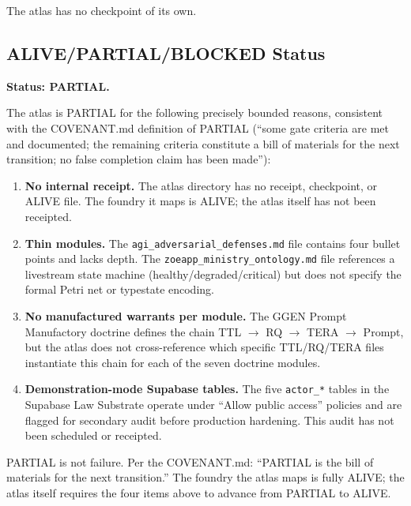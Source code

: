 The atlas has no checkpoint of its own.

\subsection{ALIVE/PARTIAL/BLOCKED Status}
\label{sec:atlas-evidence-status}

\textbf{Status: PARTIAL.}

The atlas is PARTIAL for the following precisely bounded reasons, consistent
with the COVENANT.md definition of PARTIAL (``some gate criteria are met and
documented; the remaining criteria constitute a bill of materials for the next
transition; no false completion claim has been made''):

\begin{enumerate}
  \item \textbf{No internal receipt.} The atlas directory has no receipt,
        checkpoint, or ALIVE file. The foundry it maps is ALIVE; the atlas
        itself has not been receipted.

  \item \textbf{Thin modules.} The \texttt{agi\_adversarial\_defenses.md} file
        contains four bullet points and lacks depth. The
        \texttt{zoeapp\_ministry\_ontology.md} file references a livestream state
        machine (healthy/degraded/critical) but does not specify the formal
        Petri net or typestate encoding.

  \item \textbf{No manufactured warrants per module.} The GGEN Prompt
        Manufactory doctrine defines the chain TTL $\to$ RQ $\to$ TERA $\to$
        Prompt, but the atlas does not cross-reference which specific TTL/RQ/TERA
        files instantiate this chain for each of the seven doctrine modules.

  \item \textbf{Demonstration-mode Supabase tables.} The five
        \texttt{actor\_*} tables in the Supabase Law Substrate operate under
        ``Allow public access'' policies and are flagged for secondary audit
        before production hardening. This audit has not been scheduled or
        receipted.
\end{enumerate}

PARTIAL is not failure. Per the COVENANT.md: ``PARTIAL is the bill of materials
for the next transition.'' The foundry the atlas maps is fully ALIVE; the atlas
itself requires the four items above to advance from PARTIAL to ALIVE.
